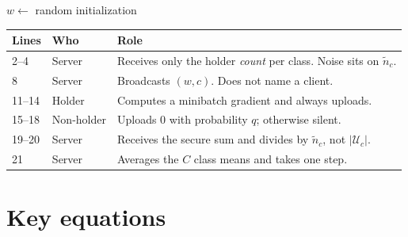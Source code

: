 \documentclass[11pt,a4paper]{article}
\theoremstyle{plain}
\begin{document}
\begin{algorithm}[H]
\DontPrintSemicolon
\caption{FedSelfSelect}
$w \leftarrow$ random initialization\;
\BlankLine
{}
\BlankLine
{}
\end{algorithm}

\vspace{0.4em}
\noindent
\begin{tabular}{@{}llp{9.4cm}@{}}
\toprule
Lines & Who & Role \\
\midrule
2--4 & Server & Receives only the holder \emph{count} per class. Noise sits on $\tilde n_c$. \\
8 & Server & Broadcasts $(w,c)$. Does not name a client. \\
11--14 & Holder & Computes a minibatch gradient and always uploads. \\
15--18 & Non-holder & Uploads $0$ with probability $q$; otherwise silent. \\
19--20 & Server & Receives the secure sum and divides by $\tilde n_c$, not $|\mathcal{U}_c|$. \\
21 & Server & Averages the $C$ class means and takes one step. \\
\bottomrule
\end{tabular}

\section{Key equations}
\end{document}
